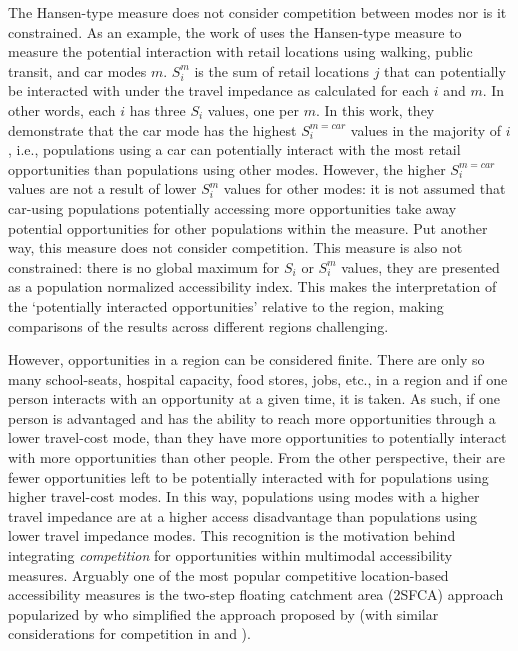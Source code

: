 \documentclass[]{trbunofficial}
\begin{document}
The Hansen-type measure does not consider competition between modes nor
is it constrained. As an example, the work of
\citet{tahmasbiMultimodalAccessibilitybasedEquity2019} uses the
Hansen-type measure to measure the potential interaction with retail
locations using walking, public transit, and car modes \(m\). \(S_i^m\)
is the sum of retail locations \(j\) that can potentially be interacted
with under the travel impedance as calculated for each \(i\) and \(m\).
In other words, each \(i\) has three \(S_i\) values, one per \(m\). In
this work, they demonstrate that the car mode has the highest
\(S_i^{m=car}\) values in the majority of \(i\), i.e., populations using
a car can potentially interact with the most retail opportunities than
populations using other modes. However, the higher \(S_i^{m=car}\)
values are not a result of lower \(S_i^{m}\) values for other modes: it
is not assumed that car-using populations potentially accessing more
opportunities take away potential opportunities for other populations
within the measure. Put another way, this measure does not consider
competition. This measure is also not constrained: there is no global
maximum for \(S_i\) or \(S_i^m\) values, they are presented as a
population normalized accessibility index. This makes the interpretation
of the `potentially interacted opportunities' relative to the region,
making comparisons of the results across different regions challenging.

However, opportunities in a region can be considered finite. There are
only so many school-seats, hospital capacity, food stores, jobs, etc.,
in a region and if one person interacts with an opportunity at a given
time, it is taken. As such, if one person is advantaged and has the
ability to reach more opportunities through a lower travel-cost mode,
than they have more opportunities to potentially interact with more
opportunities than other people. From the other perspective, their are
fewer opportunities left to be potentially interacted with for
populations using higher travel-cost modes. In this way, populations
using modes with a higher travel impedance are at a higher access
disadvantage than populations using lower travel impedance modes. This
recognition is the motivation behind integrating \emph{competition} for
opportunities within multimodal accessibility measures. Arguably one of
the most popular competitive location-based accessibility measures is
the two-step floating catchment area (2SFCA) approach popularized by
\citet{luoMeasuresSpatialAccessibility2003} who simplified the approach
proposed by \citet{shenLocationCharacteristicsInnercity1998} (with
similar considerations for competition in
\citet{weibullAxiomaticApproachMeasurement1976} and
\citet{josephMeasuringPotentialPhysical1982}).
\end{document}
